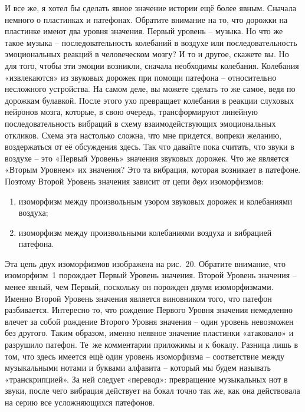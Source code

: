 \documentclass[../main.tex]{subfiles}
\begin{document}
И все же, я хотел бы сделать явное значение истории ещё более явным. Сначала немного о пластинках и патефонах. Обратите внимание на то, что дорожки на пластинке имеют два уровня значения. Первый уровень \--- музыка. Но что же такое музыка \--- последовательность колебаний в воздухе или последовательность эмоциональных реакций в человеческом мозгу? И то и другое, скажете вы. Но для того, чтобы эти эмоции возникли, сначала необходимы колебания. Колебания «извлекаются» из звуковых дорожек при помощи патефона \--- относительно несложного устройства. На самом деле, вы можете сделать то же самое, ведя по дорожкам булавкой. После этого ухо превращает колебания в реакции слуховых нейронов мозга, которые, в свою очередь, трансформируют линейную последовательность вибраций в схему взаимодействующих эмоциональных откликов. Схема эта настолько сложна, что мне придется, вопреки желанию, воздержаться от её обсуждения здесь. Так что давайте пока считать, что звуки в воздухе \--- это «Первый Уровень» значения звуковых дорожек. Что же является «Вторым Уровнем» их значения? Это та вибрация, которая возникает в патефоне. Поэтому Второй Уровень значения зависит от цепи \emph{двух} изоморфизмов:

\begin{enumerate}[label=(\arabic*), noitemsep, topsep=6pt]
    \item изоморфизм между произвольным узором звуковых дорожек и колебаниями воздуха;
    \item изоморфизм между произвольными колебаниями воздуха и вибрацией патефона.
\end{enumerate}

Эта цепь двух изоморфизмов изображена на рис.~20. Обратите внимание, что изоморфизм~1 порождает Первый Уровень значения. Второй Уровень значения \--- менее явный, чем Первый, поскольку он порожден двумя изоморфизмами. Именно Второй Уровень значения является виновником того, что патефон разбивается. Интересно то, что рождение Первого Уровня значения немедленно влечет за собой рождение Второго Уровня значения \--- один уровень невозможен без другого. Таким образом, именно неявное значение пластинки «атаковало» и разрушило патефон. Те~же комментарии приложимы и к бокалу. Разница лишь в том, что здесь имеется ещё один уровень изоморфизма \--- соответствие между музыкальными нотами и буквами алфавита \--- который мы будем называть «транскрипцией». За ней следует «перевод»: превращение музыкальных нот в звуки, после чего вибрация действует на бокал точно так же, как она действовала на серию все усложняющихся патефонов.
\end{document}
